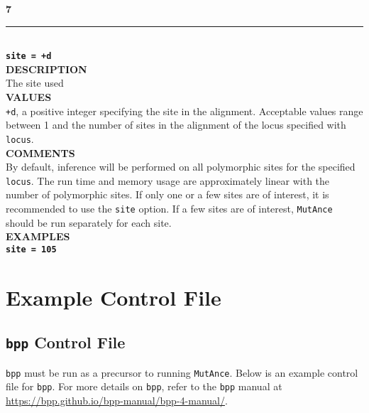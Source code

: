 \documentclass[11pt]{article}
\begin{document}
\noindent\textbf{{\large 7}} \\
\noindent\rule{\textwidth}{0.8pt} \\
\textbf{{\Large \texttt{site = +d}}} \vspace{5pt}\\
\textbf{DESCRIPTION} \vspace{5pt}\\
The site used \vspace{5pt}\\
\textbf{VALUES} \vspace{5pt}\\
\texttt{+d}, a positive integer specifying the site in the alignment. Acceptable values range between 1 and the number of sites in the alignment of the locus specified with \texttt{locus}. \vspace{10pt}\\
\textbf{COMMENTS} \vspace{5pt}\\
By default, inference will be performed on all polymorphic sites for the specified \texttt{locus}.
The run time and memory usage are approximately linear with the number of polymorphic sites.
If only one or a few sites are of interest, it is recommended to use the \texttt{site} option.
If a few sites are of interest, \texttt{MutAnce} should be run separately for each site.
\vspace{5pt}\\
\textbf{EXAMPLES} \vspace{5pt}\\
\textbf{\texttt{site = 105 }}\vspace{10pt}\\

\section{Example Control File}
\subsection{\texttt{bpp} Control File}
\texttt{bpp} must be run as a precursor to running \texttt{MutAnce}. 
Below is an example control file for \texttt{bpp}. 
For more details on \texttt{bpp}, refer to the \texttt{bpp} manual at \href{https://bpp.github.io/bpp-manual/bpp-4-manual/}{https://bpp.github.io/bpp-manual/bpp-4-manual/}.
\end{document}
